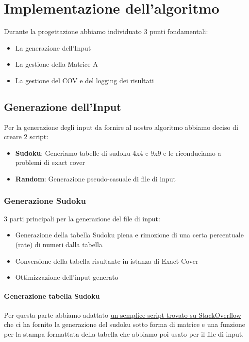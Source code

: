 \chapter{Implementazione dell'algoritmo}
Durante la progettazione abbiamo individuato 3 punti fondamentali:
\begin{itemize}
    \item La generazione dell'Input
    \item La gestione della Matrice A
    \item La gestione del COV e del logging dei risultati
\end{itemize}

\section{Generazione dell'Input}
Per la generazione degli input da fornire al nostro algoritmo abbiamo deciso di creare 2 script:
\begin{itemize}
    \item \textbf{Sudoku}: Generiamo tabelle di sudoku 4x4 e 9x9 e le riconduciamo a problemi di exact cover
    \item \textbf{Random}: Generazione pseudo-casuale di file di input
\end{itemize}

\subsection{Generazione Sudoku}
3 parti principali per la generazione del file di input:
\begin{itemize}
    \item Generazione della tabella Sudoku piena e rimozione di una certa percentuale (rate) di numeri dalla tabella
    \item Conversione della tabella risultante in istanza di Exact Cover
    \item Ottimizzazione dell'input generato
\end{itemize}
\subsubsection{Generazione tabella Sudoku}
Per questa parte abbiamo adattato  \href{https://stackoverflow.com/questions/45471152/how-to-create-a-sudoku-puzzle-in-python}{\underline{un semplice script trovato su StackOverflow}} che ci ha fornito la generazione del sudoku sotto forma di matrice e una funzione per la stampa formattata della tabella che abbiamo poi usato per il file di input.
